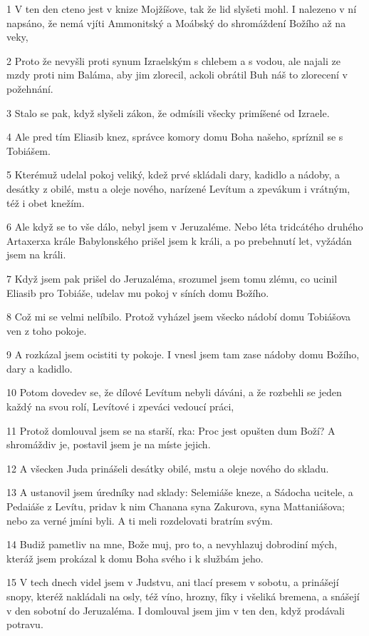 \par 1 V ten den cteno jest v knize Mojžíšove, tak že lid slyšeti mohl. I nalezeno v ní napsáno, že nemá vjíti Ammonitský a Moábský do shromáždení Božího až na veky,
\par 2 Proto že nevyšli proti synum Izraelským s chlebem a s vodou, ale najali ze mzdy proti nim Baláma, aby jim zlorecil, ackoli obrátil Buh náš to zlorecení v požehnání.
\par 3 Stalo se pak, když slyšeli zákon, že odmísili všecky primíšené od Izraele.
\par 4 Ale pred tím Eliasib knez, správce komory domu Boha našeho, spríznil se s Tobiášem.
\par 5 Kterémuž udelal pokoj veliký, kdež prvé skládali dary, kadidlo a nádoby, a desátky z obilé, mstu a oleje nového, narízené Levítum a zpevákum i vrátným, též i obet knežím.
\par 6 Ale když se to vše dálo, nebyl jsem v Jeruzaléme. Nebo léta tridcátého druhého Artaxerxa krále Babylonského prišel jsem k králi, a po prebehnutí let, vyžádán jsem na králi.
\par 7 Když jsem pak prišel do Jeruzaléma, srozumel jsem tomu zlému, co ucinil Eliasib pro Tobiáše, udelav mu pokoj v síních domu Božího.
\par 8 Což mi se velmi nelíbilo. Protož vyházel jsem všecko nádobí domu Tobiášova ven z toho pokoje.
\par 9 A rozkázal jsem ocistiti ty pokoje. I vnesl jsem tam zase nádoby domu Božího, dary a kadidlo.
\par 10 Potom dovedev se, že dílové Levítum nebyli dáváni, a že rozbehli se jeden každý na svou rolí, Levítové i zpeváci vedoucí práci,
\par 11 Protož domlouval jsem se na starší, rka: Proc jest opušten dum Boží? A shromáždiv je, postavil jsem je na míste jejich.
\par 12 A všecken Juda prinášeli desátky obilé, mstu a oleje nového do skladu.
\par 13 A ustanovil jsem úredníky nad sklady: Selemiáše kneze, a Sádocha ucitele, a Pedaiáše z Levítu, pridav k nim Chanana syna Zakurova, syna Mattaniášova; nebo za verné jmíni byli. A ti meli rozdelovati bratrím svým.
\par 14 Budiž pametliv na mne, Bože muj, pro to, a nevyhlazuj dobrodiní mých, kteráž jsem prokázal k domu Boha svého i k službám jeho.
\par 15 V tech dnech videl jsem v Judstvu, ani tlací presem v sobotu, a prinášejí snopy, kteréž nakládali na osly, též víno, hrozny, fíky i všeliká bremena, a snášejí v den sobotní do Jeruzaléma. I domlouval jsem jim v ten den, když prodávali potravu.
